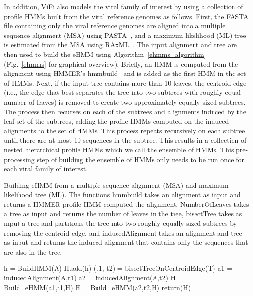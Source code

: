 \documentclass[a4,center,fleqn]{NAR}
\begin{document}
In addition, ViFi also models the viral family of interest by using a collection of profile HMMs built from the viral reference genomes as follows.  First, the FASTA file containing only the viral reference genomes are aligned into a multiple sequence alignment (MSA) using PASTA~\cite{Mirarab2014}, and a maximum likelihood (ML) tree is estimated from the MSA using RAxML~\cite{Stamatakis2014}.  The input alignment and tree are then used to build the eHMM using Algorithm~\ref{ehmms_algorithm} (Fig.~\ref{ehmms} for graphical overview).  Briefly, an HMM is computed from the alignment using HMMER's hmmbuild~\cite{Eddy1998} and is added as the first HMM in the set of HMMs.  Next, if the input tree contains more than 10 leaves, the centroid edge (i.e., the edge that best separates the tree into two subtrees with roughly equal number of leaves) is removed to create two approximately equally-sized subtrees.  The process then recurses on each of the subtrees and alignments induced by the leaf set of the subtrees, adding the profile HMMs computed on the induced alignments to the set of HMMs.  This process repeats recursively on each subtree until there are at most 10 sequences in the subtree.  This results in a collection of nested hierarchical profile HMMs which we call the ensemble of HMMs.  This pre-processing step of building the ensemble of HMMs only needs to be run once for each viral family of interest.

\begin{algorithm}
 \caption{\label{ehmms_algorithm}Building eHMM from a multiple sequence alignment (MSA) and maximum likelihood tree (ML).  The functions hmmbuild takes an alignment as input and returns a HMMER profile HMM computed the alignment, NumberOfLeaves takes a tree as input and returns the number of leaves in the tree, bisectTree takes as input a tree and partitions the tree into two roughly equally sized subtrees by removing the centroid edge, and inducedAlignment takes an alignment and tree as input and returns the induced alignment that contains only the sequences that are also in the tree.}
  \begin{algorithmic}[1]
      \State h = BuildHMM(A)
      \State H.add(h) 
        \State (t1, t2) = bisectTreeOnCentroidEdge(T) 
        \State a1 = inducedAlignment(A,t1) 
        \State a2 = inducedAlignment(A,t2)
        \State H = {\sc Build\_eHMM}(a1,t1,H)
        \State H = {\sc Build\_eHMM}(a2,t2,H)
      \Else
        \State return(H)
      \EndIf
     \EndFunction
\end{algorithmic}
\end{algorithm}
\end{document}
